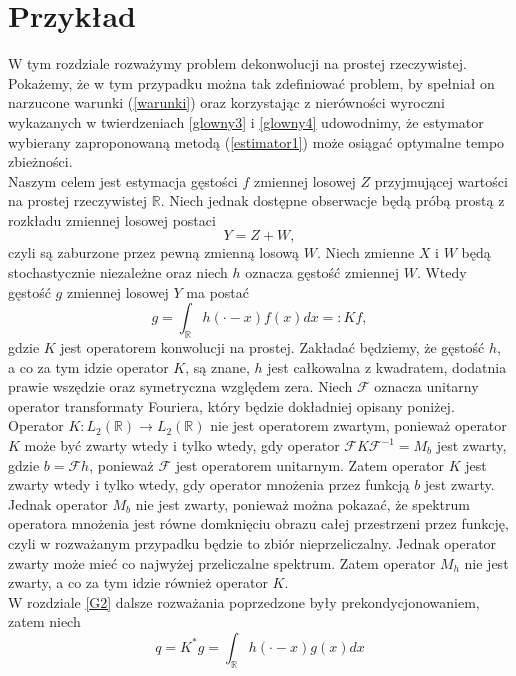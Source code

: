 \documentclass[man,mfiu]{mgrwms}
\begin{document}
\chapter{Przykład}\label{przyklad}
W tym rozdziale rozważymy problem dekonwolucji na prostej rzeczywistej. Pokażemy, że w tym przypadku można tak zdefiniować problem, by spełniał on narzucone warunki (\ref{warunki}) oraz korzystając z nierówności wyroczni wykazanych w twierdzeniach \ref{glowny3} i \ref{glowny4} udowodnimy, że estymator wybierany zaproponowaną metodą (\ref{estimator1}) może osiągać optymalne tempo zbieżności.\\
\indent Naszym celem jest estymacja gęstości $f$ zmiennej losowej $Z$ przyjmującej wartości na prostej rzeczywistej $\mathbb{R}$. Niech jednak dostępne obserwacje będą próbą prostą z rozkładu zmiennej losowej postaci
\begin{displaymath}
Y=Z+W,
\end{displaymath}
czyli są zaburzone przez pewną zmienną losową $W$. Niech zmienne $X$ i $W$ będą stochastycznie niezależne oraz niech $h$ oznacza gęstość zmiennej $W$. Wtedy gęstość $g$ zmiennej losowej $Y$ ma postać 
\begin{equation}\label{0}
g=\int_{\mathbb{R}}h(\cdot -x)f(x)dx=\colon Kf,
\end{equation}
gdzie $K$ jest operatorem konwolucji na prostej. Zakładać będziemy, że gęstość $h$, a co za tym idzie operator $K$, są znane, $h$ jest całkowalna z kwadratem, dodatnia prawie wszędzie oraz symetryczna względem zera. Niech $\mathcal{F}$ oznacza unitarny operator transformaty Fouriera, który będzie dokładniej opisany poniżej. Operator $K\colon L_2(\mathbb{R}) \to L_2(\mathbb{R})$ nie jest operatorem zwartym, ponieważ operator $K$ może być zwarty wtedy i tylko wtedy, gdy operator $\mathcal{F}K\mathcal{F}^{-1} = M_b$ jest zwarty, gdzie $b = \mathcal{F}h$,  ponieważ $\mathcal{F}$ jest operatorem unitarnym. Zatem operator $K$ jest zwarty wtedy i tylko wtedy, gdy operator mnożenia przez funkcją $b$ jest zwarty. Jednak operator $M_b$ nie jest zwarty, ponieważ można pokazać, że spektrum operatora mnożenia jest równe domknięciu obrazu całej przestrzeni przez funkcję, czyli w rozważanym przypadku będzie to zbiór nieprzeliczalny. Jednak operator zwarty może mieć co najwyżej przeliczalne spektrum. Zatem operator $M_h$ nie jest zwarty, a co za tym idzie również operator $K$.\\
\indent W rozdziale \ref{G2} dalsze rozważania poprzedzone były prekondycjonowaniem, zatem niech 
\begin{displaymath}
q=K^*g = \int_{\mathbb{R}}h(\cdot -x)g(x)dx
\end{displaymath}
\end{document}

